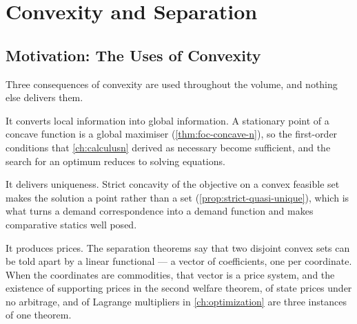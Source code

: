 
\chapter{Convexity and Separation}
\label{ch:convex}

\section{Motivation: The Uses of Convexity}\label{sec:cvx-motivation}

Three consequences of convexity are used throughout the volume, and nothing else
delivers them.

It converts local information into global information. A stationary point of a
concave function is a global maximiser (\autoref{thm:foc-concave-n}), so the
first-order conditions that \autoref{ch:calculusn} derived as necessary become
sufficient, and the search for an optimum reduces to solving equations.

It delivers uniqueness. Strict concavity of the objective on a convex feasible
set makes the solution a point rather than a set
(\autoref{prop:strict-quasi-unique}), which is what turns a demand
correspondence into a demand function and makes comparative statics well posed.

It produces prices. The separation theorems say that two disjoint convex sets can
be told apart by a linear functional --- a vector of coefficients, one per
coordinate. When the coordinates are commodities, that vector is a price system,
and the existence of supporting prices in the second welfare theorem, of state
prices under no arbitrage, and of Lagrange multipliers in
\autoref{ch:optimization} are three instances of one theorem.

